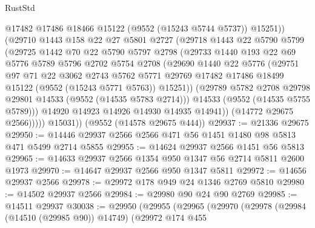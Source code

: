 \begin{lexlean}{RustStd}
\begin{coremodule}
                  @17482
                  @17486
                  @18466
                  @15122
                  (@9552 (@15243 @5744 @5737))
                  @15251))
              (@29710
                @1443
                @158
                @22
                @27
                @5801
                @2727
                (@29718
                  @1443
                  @22
                  @5790
                  @5799
                  (@29725
                    @1442
                    @70
                    @22
                    @5790
                    @5797
                    @2798
                    (@29733
                      @1440
                      @193
                      @22
                      @69
                      @5776
                      @5789
                      @5796
                      @2702
                      @5754
                      @2708
                      (@29690
                        @1440
                        @22
                        @5776
                        (@29751
                          @97
                          @71
                          @22
                          @3062
                          @2743
                          @5762
                          @5771
                          @29769
                          @17482
                          @17486
                          @18499
                          @15122
                          (@9552 (@15243 @5771 @5763))
                          @15251))
                      (@29789 @5782 @2708 @29798 @29801 @14533 (@9552 (@14535 @5783 @2714)))
                      @14533
                      (@9552 (@14535 @5755 @5789)))
                    @14920
                    @14923
                    @14926
                    @14930
                    @14935
                    @14941))
                (@14772 @29675 @2566)))))
        @15031))
    (@9552 (@14578 @29675 @444))
@29937 := @21336 @29675
@29950 := @14446 @29937 @2566 @2566 @471 @56 @1451 @1480 @98 @5813 @471 @5499 @2714 @5855
@29955 := @14624 @29937 @2566 @1451 @56 @5813
@29965 := @14633 @29937 @2566 @1354 @950 @1347 @56 @2714 @5811 @2600 @1973
@29970 := @14647 @29937 @2566 @950 @1347 @5811
@29972 := @14656 @29937 @2566
@29978 := @29972 @178 @949 @24 @1346 @2769 @5810
@29980 := @14502 @29937 @2566
@29984 := @29980 @90 @24 @90 @2769
@29985 := @14511 @29937
@30038 := @29950
    (@29955
      (@29965
        (@29970
          (@29978
            (@29984 (@14510 (@29985 @90)) @14749)
            (@29972
              @174
              @455

\end{coremodule}
\end{lexlean}
